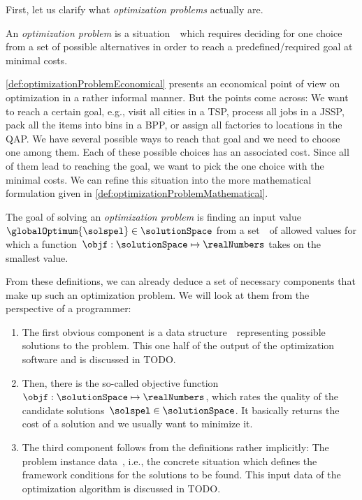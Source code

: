 First, let us clarify what \emph{optimization problems} actually are.%
%
\begin{definition}%
\label{def:optimizationProblemEconomical}%
An \emph{optimization problem} is a situation~\instance\ which requires deciding for one choice from a set of possible alternatives in order to reach a predefined/required goal at minimal costs.%
\end{definition}%
%
\cref{def:optimizationProblemEconomical} presents an economical point of view on optimization in a rather informal manner.
But the points come across:
We want to reach a certain goal, e.g., visit all cities in a \gls{TSP}, process all jobs in a \gls{JSSP}, pack all the items into bins in a \gls{BPP}, or assign all factories to locations in the \gls{QAP}.
We have several possible ways to reach that goal and we need to choose one among them.
Each of these possible choices has an associated cost.
Since all of them lead to reaching the goal, we want to pick the one choice with the minimal costs.
We can refine this situation into the more mathematical formulation given in \cref{def:optimizationProblemMathematical}.%
%
\begin{definition}%
\label{def:optimizationProblemMathematical}%
The goal of solving an \emph{optimization problem} is finding an input value~$\globalOptimum{\solspel}\in\solutionSpace$ from a set~\solutionSpace\ of allowed values for which a function~$\objf:\solutionSpace\mapsto\realNumbers$ takes on the smallest value.%
\end{definition}%
%
From these definitions, we can already deduce a set of necessary components that make up such an optimization problem.
We will look at them from the perspective of a programmer:%
%
\begin{enumerate}%
%
\item The first obvious component is a data structure~\solutionSpace\ representing possible solutions to the problem.
This one half of the output of the optimization software and is discussed in TODO.%
%
\item Then, there is the so-called objective function~$\objf:\solutionSpace\mapsto\realNumbers$, which rates the quality of the candidate solutions~$\solspel\in\solutionSpace$.
It basically returns the cost of a solution and we usually want to minimize it.%
%
\item The third component follows from the definitions rather implicitly:
The problem instance data~\instance, i.e., the concrete situation which defines the framework conditions for the solutions to be found.
This input data of the optimization algorithm is discussed in TODO.%
%
\end{enumerate}%
